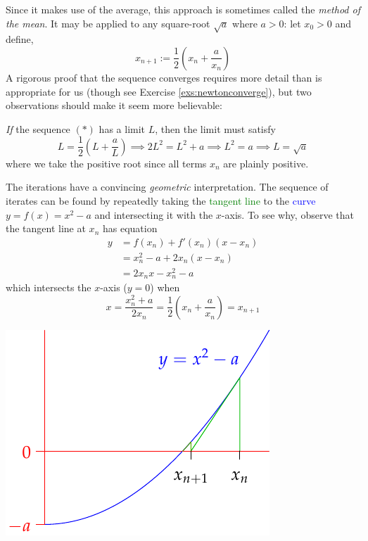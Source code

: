 Since it makes use of the average, this approach is sometimes called the \emph{method of the mean}. It may be applied to any square-root $\sqrt a$ where $a>0$: let $x_0>0$ and define,
\[
	x_{n+1}:=\frac 12\left(x_n+\frac a{x_n}\right) \tag{$\ast$}
\]
A rigorous proof that the sequence converges requires more detail than is appropriate for us (though see Exercise \ref{exs:newtonconverge}), but two observations should make it seem more believable:
\begin{enumerate}
  \item \emph{If} the sequence $(\ast)$ has a limit $L$, then the limit must satisfy
  \[
  	L=\frac 12\left(L+\frac aL\right) \implies 2L^2=L^2+a\implies L^2=a\implies L=\sqrt a
  \]
  where we take the positive root since all terms $x_n$ are plainly positive.
  
  \begin{minipage}[t]{0.61\linewidth}\vspace{0pt}
  	\item The iterations have a convincing \emph{geometric} interpretation. The sequence of iterates can be found by repeatedly taking the \textcolor{Green}{tangent line} to the \textcolor{blue}{curve} $y=f(x)=x^2-a$ and intersecting it with the $x$-axis. To see why, observe that the tangent line at $x_n$ has equation
  	\begin{align*}
  		y&=f(x_n)+f'(x_n)(x-x_n)\\
  		&=x_n^2-a+2x_n(x-x_n)\\
  		&=2x_nx-x_n^2-a
  	\end{align*}
  	which intersects the $x$-axis ($y=0$) when
  	\[
  		x=\frac{x_n^2+a}{2x_n}=\frac 12\left(x_n+\frac a{x_n}\right) =x_{n+1}
  	\] 
  \end{minipage}
  \hfill
  \begin{minipage}[t]{0.38\linewidth}\vspace{0pt}
  	\flushright\includegraphics[scale=0.95]{newton-raphson}
  \end{minipage}
\end{enumerate}

